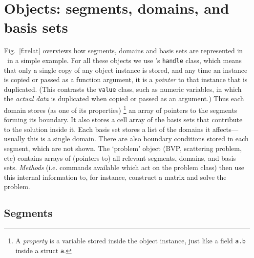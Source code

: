\documentclass[12pt]{article}
\begin{document}
\bfi %
\efi


\section{Objects: segments, domains, and basis sets}

Fig.~\ref{f:relat} overviews how segments, domains and basis sets are
represented in \mpspack\ in a simple example.
For all these objects we use \matlab's {\tt handle} class,
which means that only a single copy of any object instance is
stored, and any time an instance is copied or passed as a function argument,
it is a {\em pointer} to that instance that is duplicated.
(This contrasts the {\tt value} class, such as numeric variables,
in which the {\em actual data} is duplicated when copied or passed as an
argument.)
Thus each domain stores (as one of its properties)%
  \footnote{A {\em property} is a variable stored inside the
    object instance, just like a field {\tt a.b} inside a struct {\tt a}.}
an array of pointers to the
segments forming its boundary.
It also stores a cell array of the basis sets that
contribute to the solution inside it.
Each basis set stores a list of the domains it affects---usually
this is a single domain.
There are also boundary conditions stored in
each segment, which are not shown.
The `problem' object (BVP, scattering problem, etc) contains arrays of
(pointers to) all relevant segments, domains, and basis sets.
{\em Methods} (i.e. commands available which act on the problem class)
then use this internal information to, for instance,
construct a matrix and solve the problem.

\subsection{Segments} %
\end{document}
